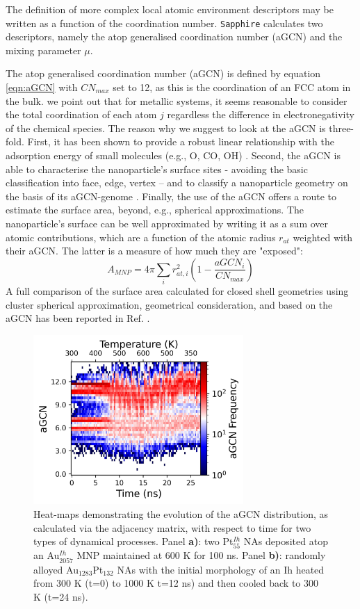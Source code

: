 The definition of more complex local atomic environment descriptors may be written as a function of the coordination number. \texttt{Sapphire} calculates two descriptors, namely the atop generalised coordination number (aGCN) and the mixing parameter $\mu$. 

The atop generalised coordination number (aGCN) \cite{Calle-Vallejo2014} is defined by equation \ref{eqn:aGCN}
with $CN_{max}$ set to 12, as this is the coordination of an FCC atom in the bulk. we point out that for metallic systems, it seems reasonable to consider the total coordination of each atom $j$ regardless the difference in electronegativity of the chemical species.
%
The reason why we suggest to look at the aGCN is three-fold. First, it has been shown to provide a robust linear relationship with the adsorption energy of small molecules (e.g., O, CO, OH) \cite{Calle2015}.
Second, the aGCN is able to characterise the nanoparticle's surface sites - avoiding the basic classification into face, edge, vertex -- and to classify a nanoparticle geometry on the basis of its aGCN-genome \cite{Rossi2019}.
%
Finally, the use of the aGCN offers a route to estimate the surface area, beyond, e.g., spherical approximations. 
%
The nanoparticle's surface can be well approximated by writing it as a sum over atomic contributions, which are a function of the atomic radius $r_{at}$ weighted with their aGCN. The latter is a measure of how much they are "exposed": \cite{Rossi2020}
\begin{equation}
  A_{MNP} = 4 \pi \sum_{i}r^2_{at,i}\left(1 - \frac{aGCN_i}{CN_{max}}  \right)
\end{equation}
%
A full comparison of the surface area calculated for closed shell geometries using cluster spherical approximation, geometrical consideration, and based on the aGCN has been reported in Ref. \cite{Rossi2020}.

\begin{figure}[t!]
    \centering
    \includegraphics[width = 8cm]{figures/Sapphire/aGCN.jpeg}
    \caption{Heat-maps demonstrating the evolution of the aGCN distribution, as calculated via the adjacency matrix, with respect to time for two types of dynamical processes. Panel \textbf{a)}: two Pt$_{55}^{Ih}$ NAs deposited atop an Au$_{2057}^{Ih}$ MNP maintained at 600 K for 100 ns. Panel \textbf{b)}: randomly alloyed Au$_{1283}$Pt$_{132}$ NAs with the initial morphology of an Ih heated from 300 K (t=0) to 1000 K t=12 ns) and then cooled back to 300 K (t=24 ns). }
\label{fig:agcn}
\end{figure}

